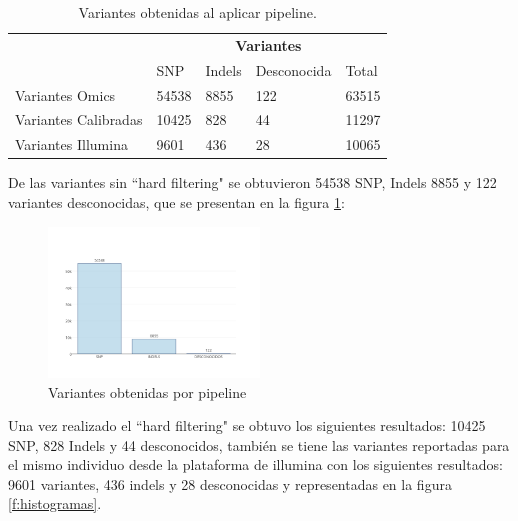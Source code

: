 \begin{table}[htb]
	\centering
	\begin{tabular}{|l|l|l|l|l|}
		\hline
		& \multicolumn{4}{c|}{\textbf{Variantes}} \\
		\cline{2-5} 
		& SNP  & Indels & Desconocida & Total \\ \cline{2-5}
		\hline 
		\multirow{1}{4cm}{Variantes Omics} & 54538 & 8855 & 122 & 63515 \\ \cline{2-5}
		\hline 
		\multirow{1}{4cm}{Variantes Calibradas} & 10425 & 828 & 44 & 11297 \\ \cline{2-5}
		\hline
		\multirow{1}{4cm}{Variantes Illumina} & 9601 & 436 & 28 & 10065 \\ \cline{2-5}
		\hline
	\end{tabular}
	\caption{Variantes obtenidas al aplicar pipeline.}
	\label{tabla:final}
\end{table}

De las variantes sin ``hard filtering" se obtuvieron 54538 SNP, Indels 8855 y 122 variantes desconocidas, que se presentan en la figura \ref{fig:omics}: 

\begin{figure}[H]
	\centering
	\includegraphics[width=0.5\textwidth]{Kap2/variantesomics}
	\caption{Variantes obtenidas por pipeline} \label{fig:omics}
\end{figure}

Una vez realizado el ``hard filtering" se obtuvo los siguientes resultados: 10425 SNP, 828 Indels y 44 desconocidos, también se tiene las variantes reportadas para el mismo individuo desde la plataforma de illumina con los siguientes resultados: 9601 variantes, 436 indels y 28 desconocidas y representadas en la figura \ref{f:histogramas}.

